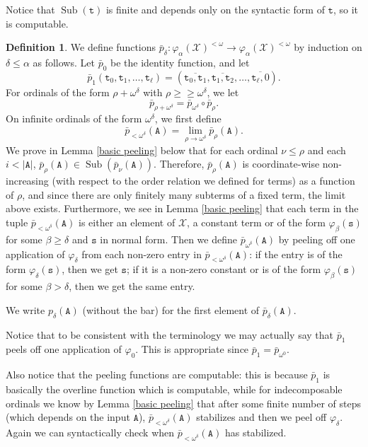 \documentclass[11pt]{amsart}
\theoremstyle{definition}
\newtheorem{definition}[thm]{Definition}
\theoremstyle{remark}
\theoremstyle{plain}
\newcommand{\Sub}{\operatorname{Sub}}
\def\X{\mathcal{X}}
\def\om{\omega}
\def\a{\alpha}
\def\b{\beta}
\def\d{\delta}
\def\pbar{\bar{p}}
\def\ggeq{\mathrel{\geq\!\!\!\geq}}
\begin{document}
Notice that $\Sub(\mathtt{t})$ is finite and depends only on the syntactic form of $\mathtt{t}$, so it is computable.

\begin{definition}\label{peeling def}
We define functions $\pbar_\d : \varphi_\a(\X)^{<\om} \to \varphi_\a(\X)^{<\om}$ by induction on $\d \le \a$ as follows.
Let $\pbar_0$ be the identity function, and let
$$\pbar_1 (\mathtt{t}_0, \mathtt{t}_1, \ldots, \mathtt{t}_\ell) = (\overline{\mathtt{t}_0,\mathtt{t}_1}, \overline{\mathtt{t}_1,\mathtt{t}_2}, \ldots, \overline{\mathtt{t}_\ell,0}).$$
For ordinals of the form $\rho + \om^\d$ with $\rho \ggeq \om^\d$, we let
$$\pbar_{\rho + \om^\d} = \pbar_{\om^\d} \circ \pbar_\rho.$$
On infinite ordinals of the form $\om^\d$, we first define
$$\pbar_{< \om^\d}(\mathtt{A}) = \lim_{\rho \to \om^\d} \pbar_\rho (\mathtt{A}).$$
We prove in Lemma \ref{basic peeling} below that for each ordinal $\nu \le \rho$ and each $i < |\mathtt{A}|$, $\pbar_\rho (\mathtt{A}) \in \Sub (\pbar_\nu (\mathtt{A}))$.
Therefore, $\pbar_\rho(\mathtt{A})$ is coordinate-wise non-increasing (with respect to the order relation we defined for terms) as a function of $\rho$, and since there are only finitely many subterms of a fixed term, the limit above exists.
Furthermore, we see in Lemma \ref{basic peeling} that each term in the tuple $\pbar_{< \om^\d} (\mathtt{A})$ is either an element of $\X$, a constant term or of the form $\varphi_\b(\mathtt{s})$ for some $\b \ge \d$ and $\mathtt{s}$ in normal form.
Then we define $\pbar_{\om^\d} (\mathtt{A})$ by peeling off one application of $\varphi_\d$ from each non-zero entry in $\pbar_{<\om^\d} (\mathtt{A})$: if the entry is of the form $\varphi_\d(\mathtt{s})$, then we get $\mathtt{s}$; if it is a non-zero constant or is of the form $\varphi_\b(\mathtt{s})$ for some $\b > \d$, then we get the same entry. 

We write $p_\d (\mathtt{A})$ (without the bar) for the first element of $\pbar_\d (\mathtt{A})$.
\end{definition}

Notice that to be consistent with the terminology we may actually say that $\pbar_1$ peels off one application of $\varphi_0$.
This is appropriate since $\pbar_1 = \pbar_{\om^0}$.

Also notice that the peeling functions are computable: this is because $\pbar_1$ is basically the overline function which is computable, while for indecomposable ordinals we know by Lemma \ref{basic peeling} that after some finite number of steps (which depends on the input $\mathtt{A}$), $\pbar_{< \om^\d}(\mathtt{A})$ stabilizes and then we peel off $\varphi_\d$.
Again we can syntactically check when $\pbar_{< \om^\d}(\mathtt{A})$ has stabilized.
		
\end{document}
